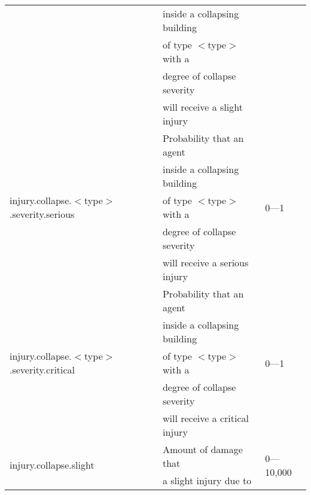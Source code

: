 \documentclass{article}
\begin{document}
\begin{table}[htb]
\begin{tabular}{lll}
                                                                & inside a
  collapsing building                   & \\
                                                                & of type
   $<$type$>$ with a                    & \\
                                                                & degree of
  collapse severity                     & \\
                                                                & will receive a
  slight injury                         & \\
  \hline
  \multirow{5}{*}{injury.collapse.$<$type$>$.severity.serious}  & Probability
  that an agent                         & \multirow{5}{*}{0---1}\\
                                                                & inside a
  collapsing building                   & \\
                                                                & of type
   $<$type$>$ with a                    & \\
                                                                & degree of
  collapse severity                     & \\
                                                                & will receive a
  serious injury                        & \\
  \hline
  \multirow{5}{*}{injury.collapse.$<$type$>$.severity.critical} & Probability
  that an agent                         & \multirow{5}{*}{0---1}\\
                                                                & inside a
  collapsing building                   & \\
                                                                & of type
  $<$type$>$ with a                     & \\
                                                                & degree of
  collapse severity                     & \\
                                                                & will receive a
  critical injury                       & \\
  \hline
  \multirow{3}{*}{injury.collapse.slight}                       & Amount of
  damage that                           & \multirow{3}{*}{0---10,000}\\
                                                                & a slight
  injury due to                         & \\

\end{tabular}
\end{table}
\end{document}
